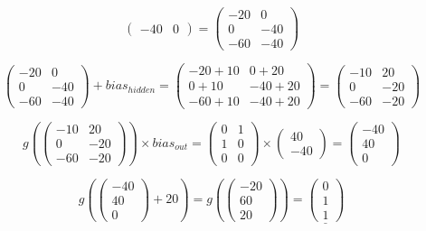 \documentclass[12pt]{article}
\begin{document}
{$$\begin{pmatrix}
    -40 & 0
  \end{pmatrix}
  =
  \begin{pmatrix}
    -20 & 0 \\
     0 & -40 \\
    -60 & -40
  \end{pmatrix}
  $$\par
  $$
  \begin{pmatrix}
    -20 & 0 \\
     0 & -40 \\
    -60 & -40
  \end{pmatrix}
  + bias_{hidden} =
  \begin{pmatrix}
    -20 + 10 & 0 + 20 \\
    0 + 10 & -40 + 20 \\
    -60 + 10 & -40 + 20
  \end{pmatrix}
  =
  \begin{pmatrix}
    -10 & 20 \\
     0 & -20 \\
    -60 & -20
  \end{pmatrix}
  $$\par
  $$
  g(
    \begin{pmatrix}
      -10 & 20 \\
       0 & -20 \\
      -60 & -20
    \end{pmatrix}
  ) \times bias_{out} =
  \begin{pmatrix}
    0 & 1 \\
    1 & 0 \\
    0 & 0
  \end{pmatrix}
  \times
  \begin{pmatrix}
    40 \\
    -40
  \end{pmatrix}
  =
  \begin{pmatrix}
    -40 \\
    40 \\
    0
  \end{pmatrix}
  $$\par
  $$
  g(
    \begin{pmatrix}
      -40 \\
      40 \\
      0
    \end{pmatrix}
    + 20
  ) =
  g(
    \begin{pmatrix}
      -20 \\
      60 \\
      20
    \end{pmatrix}
  ) =
  \underline{\begin{pmatrix}
    0 \\
    1 \\
    1
  \end{pmatrix}}
  $$\par
 
}
\end{document}
